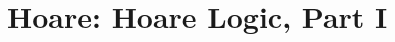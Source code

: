 \documentclass[12pt]{report}
\begin{document}

\begin{coqdoccode}
\end{coqdoccode}
\section{Hoare: Hoare Logic, Part I}
\end{document}
